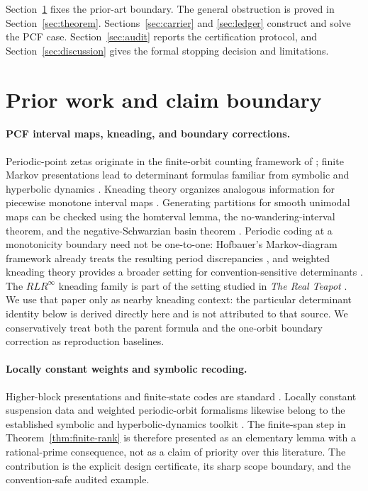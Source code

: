 \documentclass[11pt]{article}
\theoremstyle{definition}
\theoremstyle{remark}
\begin{document}
Section~\ref{sec:prior} fixes the prior-art boundary.  The general obstruction
is proved in Section~\ref{sec:theorem}.  Sections~\ref{sec:carrier} and
\ref{sec:ledger} construct and solve the PCF case.  Section~\ref{sec:audit}
reports the certification protocol, and Section~\ref{sec:discussion} gives the
formal stopping decision and limitations.

\section{Prior work and claim boundary}
\label{sec:prior}

\paragraph{PCF interval maps, kneading, and boundary corrections.}
Periodic-point zetas originate in the finite-orbit counting framework of
\citet{artin1965periodic}; finite Markov presentations lead to determinant
formulas familiar from symbolic and hyperbolic dynamics
\citep{bowen1970zeta}.  Kneading theory organizes analogous information for
piecewise monotone interval maps \citep{milnor1988iterated}.  Generating
partitions for smooth unimodal maps can be checked using the homterval lemma,
the no-wandering-interval theorem, and the negative-Schwarzian basin theorem
\citep[Chapter~II, Lemma~3.1 and Theorems~6.1--6.2]{demelo1993one}.
Periodic coding
at a monotonicity boundary need not be one-to-one: Hofbauer's Markov-diagram
framework already treats the resulting period discrepancies
\citep{hofbauer1985periodic}, and weighted kneading theory provides a broader
setting for convention-sensitive determinants \citep{rugh2015kneading}.
The \(RLR^\infty\) kneading family is part of the setting studied in
\emph{The Real Teapot} \citep{alseda2025realteapot}.  We use that paper only
as nearby kneading context: the particular determinant identity below is
derived directly here and is not attributed to that source.  We conservatively
treat both the parent formula and the one-orbit boundary correction as
reproduction baselines.

\paragraph{Locally constant weights and symbolic recoding.}
Higher-block presentations and finite-state codes are standard
\citep{lind2021symbolic}.  Locally constant suspension data and weighted
periodic-orbit formalisms likewise belong to the established symbolic and
hyperbolic-dynamics toolkit \citep{parry1990zeta,marcus1991weight}.  The
finite-span step in Theorem~\ref{thm:finite-rank} is therefore presented as an
elementary lemma with a rational-prime consequence, not as a claim of priority
over this literature.  The contribution is the explicit design certificate,
its sharp scope boundary, and the convention-safe audited example.
\end{document}

